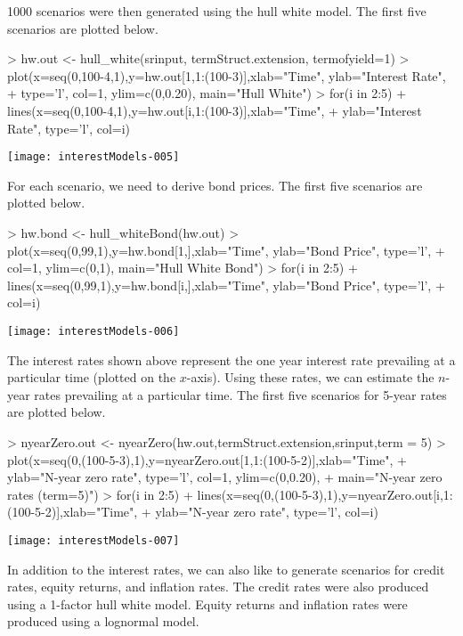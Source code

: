 \documentclass[12pt]{article}
\begin{document}
1000 scenarios were then generated using the hull white model. The first five
scenarios are plotted below.

\begin{Schunk}
\begin{Sinput}
> hw.out <- hull_white(srinput, termStruct.extension, termofyield=1)
> plot(x=seq(0,100-4,1),y=hw.out[1,1:(100-3)],xlab="Time", ylab="Interest Rate", 
+   type='l', col=1, ylim=c(0,0.20), main="Hull White")
> for(i in 2:5)
+   lines(x=seq(0,100-4,1),y=hw.out[i,1:(100-3)],xlab="Time", 
+     ylab="Interest Rate", type='l', col=i)
\end{Sinput}
\end{Schunk}
\texttt{[image: interestModels-005]}

For each scenario, we need to derive bond prices. The first five 
scenarios are plotted below.

\begin{Schunk}
\begin{Sinput}
> hw.bond <- hull_whiteBond(hw.out)
> plot(x=seq(0,99,1),y=hw.bond[1,],xlab="Time", ylab="Bond Price", type='l', 
+   col=1, ylim=c(0,1), main="Hull White Bond")
> for(i in 2:5)
+   lines(x=seq(0,99,1),y=hw.bond[i,],xlab="Time", ylab="Bond Price", type='l', 
+     col=i)
\end{Sinput}
\end{Schunk}
\texttt{[image: interestModels-006]}

The interest rates shown above represent the one year interest rate prevailing
at a particular time (plotted on the $x$-axis). Using these rates, we can 
estimate the $n$-year rates prevailing at a particular time. The first five 
scenarios for 5-year rates are plotted below.

\begin{Schunk}
\begin{Sinput}
> nyearZero.out <- nyearZero(hw.out,termStruct.extension,srinput,term = 5)
> plot(x=seq(0,(100-5-3),1),y=nyearZero.out[1,1:(100-5-2)],xlab="Time", 
+   ylab="N-year zero rate", type='l', col=1, ylim=c(0,0.20), 
+   main="N-year zero rates (term=5)")
> for(i in 2:5)
+   lines(x=seq(0,(100-5-3),1),y=nyearZero.out[i,1:(100-5-2)],xlab="Time", 
+     ylab="N-year zero rate", type='l', col=i)
\end{Sinput}
\end{Schunk}
\texttt{[image: interestModels-007]}

In addition to the interest rates, we can also like to generate scenarios
for credit rates, equity returns, and inflation rates. The credit rates 
were also produced using a 1-factor hull white model. Equity returns and 
inflation rates were produced using a lognormal model.
\end{document}
